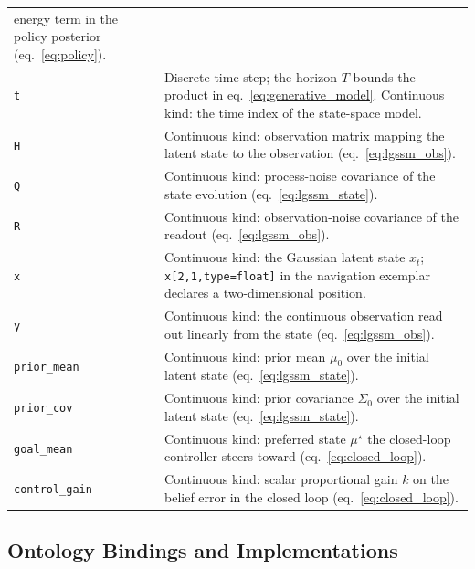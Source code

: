 \documentclass[
  english,
  9pt,
]{extarticle}
\begin{document}
\begin{longtable}[]{@{}
  >{\raggedright\arraybackslash}p{}
  >{\raggedright\arraybackslash}p{}@{}}
energy term in the policy posterior (eq.~\ref{eq:policy}). \\
\texttt{t} & Discrete time step; the horizon \(T\) bounds the product in
eq.~\ref{eq:generative_model}. Continuous kind: the time index of the
state-space model. \\
\texttt{H} & Continuous kind: observation matrix mapping the latent
state to the observation (eq.~\ref{eq:lgssm_obs}). \\
\texttt{Q} & Continuous kind: process-noise covariance of the state
evolution (eq.~\ref{eq:lgssm_state}). \\
\texttt{R} & Continuous kind: observation-noise covariance of the
readout (eq.~\ref{eq:lgssm_obs}). \\
\texttt{x} & Continuous kind: the Gaussian latent state \(x_t\);
\texttt{x{[}2,1,type=float{]}} in the navigation exemplar declares a
two-dimensional position. \\
\texttt{y} & Continuous kind: the continuous observation read out
linearly from the state (eq.~\ref{eq:lgssm_obs}). \\
\texttt{prior\_mean} & Continuous kind: prior mean \(\mu_0\) over the
initial latent state (eq.~\ref{eq:lgssm_state}). \\
\texttt{prior\_cov} & Continuous kind: prior covariance \(\Sigma_0\)
over the initial latent state (eq.~\ref{eq:lgssm_state}). \\
\texttt{goal\_mean} & Continuous kind: preferred state \(\mu^\star\) the
closed-loop controller steers toward (eq.~\ref{eq:closed_loop}). \\
\texttt{control\_gain} & Continuous kind: scalar proportional gain \(k\)
on the belief error in the closed loop (eq.~\ref{eq:closed_loop}). \\
\end{longtable}

\subsection{Ontology Bindings and
Implementations}\label{ontology-bindings-and-implementations}
\end{document}
